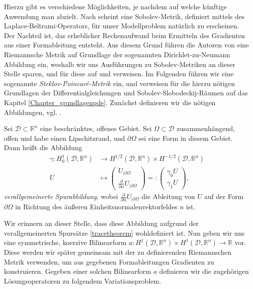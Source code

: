Hierzu gibt es verschiedene Möglichkeiten, je nachdem auf welche künftige Anwendung man abzielt. Nach \cite{shape_space} scheint eine Sobolev-Metrik, definiert mittels des Laplace-Beltrami-Operators, für unser Modellproblem natürlich zu erscheinen. Der Nachteil ist, das erheblicher Rechenaufwand beim Ermitteln des Gradienten aus einer Formableitung entsteht. Aus diesem Grund führen die Autoren von \cite{bfgs2} eine Riemannsche Metrik auf Grundlage der sogenannten Dirichlet-zu-Neumann Abbildung ein, weshalb wir uns Ausführungen zu Sobolev-Metriken an dieser Stelle sparen, und für diese auf \cite{bfgs1} und \cite{shape_space}  verweisen. Im Folgenden führen wir eine sogenannte \textit{Steklov-Poincaré-Metrik} ein, und verweisen für die hierzu nötigen Grundlagen der Differentialgleichungen und Sobolev-Slobodeckij-Räumen auf das Kapitel \ref{Chapter_grundlagenpde}. Zunächst definieren wir die nötigen Abbildungen, vgl. \cite{bfgs2}.

\begin{defi}\label{Sproperatoren}
Sei $\mathcal{D} \subset \mathbb{R}^n$ eine beschränktes, offenes Gebiet. Sei $\Omega \subset \mathcal{D}$ zusammenhängend, offen und habe einen Lipschitzrand, und $\partial \Omega$ sei eine Form in diesem Gebiet. Dann heißt die Abbildung
\begin{align*}
	\gamma: H^{1}_0(\mathcal{D}, \mathbb{R}^n) &\rightarrow H^{1/2}(\mathcal{D}, \mathbb{R}^n)\times H^{-1/2}(\mathcal{D}, \mathbb{R}^n) \\
	U &\mapsto 
	\left(\begin{matrix}
	U_{\vert \partial\Omega} \\ \frac{\partial}{\partial n} U_{\vert \partial\Omega}
	\end{matrix}\right)
	=:
	\left(\begin{matrix}
	\gamma_0 U \\ \gamma_1 U
	\end{matrix}\right)	 ,
\end{align*}
\textit{verallgemeinerte Spurabbildung}, wobei $\frac{\partial}{\partial n} U_{\vert\partial\Omega}$ die Ableitung von $U$ auf der Form $\partial \Omega$ in Richtung des äußeren Einheitsnormalenvektorfeldes $n$ ist.
\end{defi}

Wir erinnern an dieser Stelle, dass diese Abbildung aufgrund der verallgemeinerten Spursätze \ref{tracetheorem} wohldefiniert ist. Nun geben wir uns eine symmetrische, koerzive Bilinearform $a: H^1(\mathcal{D}, \mathbb{R}^n)\times H^1(\mathcal{D}, \mathbb{R}^n) \rightarrow \mathbb{R}$ vor. Diese werden wir später gemeinsam mit der zu definierenden Riemannschen Metrik verwenden, um aus gegebenen Formableitungen Gradienten zu konstruieren. Gegeben einer solchen Bilinearform $a$ definieren wir die zugehörigen Lösungsoperatoren zu folgendem Variationsproblem.

